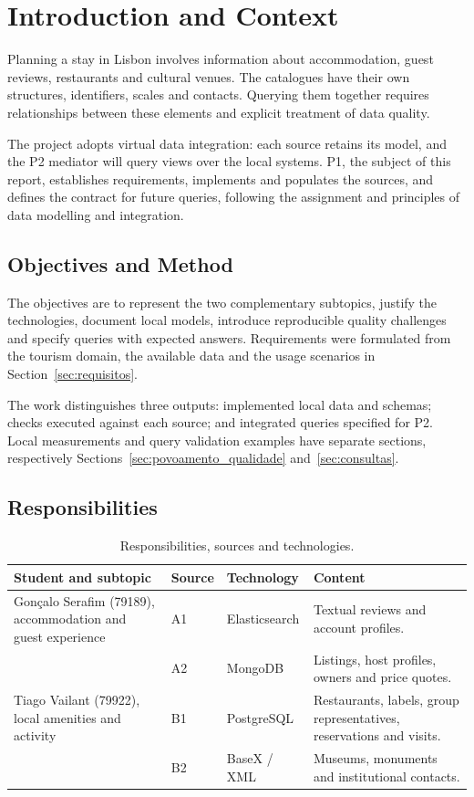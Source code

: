 \section{Introduction and Context}
\label{sec:introducao}
Planning a stay in Lisbon involves information about accommodation, guest reviews, restaurants and cultural venues. The catalogues have their own structures, identifiers, scales and contacts. Querying them together requires relationships between these elements and explicit treatment of data quality.

The project adopts virtual data integration: each source retains its model, and the P2 mediator will query views over the local systems. P1, the subject of this report, establishes requirements, implements and populates the sources, and defines the contract for future queries, following the assignment\cite{dmi_enunciado2026} and principles of data modelling and integration\cite{lemahieu2018principles,doan2012principles}.

\subsection{Objectives and Method}
The objectives are to represent the two complementary subtopics, justify the technologies, document local models, introduce reproducible quality challenges and specify queries with expected answers. Requirements were formulated from the tourism domain, the available data and the usage scenarios in Section~\ref{sec:requisitos}.

The work distinguishes three outputs: implemented local data and schemas; checks executed against each source; and integrated queries specified for P2. Local measurements and query validation examples have separate sections, respectively Sections~\ref{sec:povoamento_qualidade} and~\ref{sec:consultas}.

\subsection{Responsibilities}
\begin{table}[!htbp]
\centering\footnotesize
\setlength{\tabcolsep}{4pt}\renewcommand{\arraystretch}{1.1}
\caption{Responsibilities, sources and technologies.}\label{tab:divisao_trabalho}
\begin{tabularx}{\textwidth}{>{\raggedright\arraybackslash}p{3.2cm}l>{\raggedright\arraybackslash}p{2.5cm}X}
\toprule
\textbf{Student and subtopic} & \textbf{Source} & \textbf{Technology} & \textbf{Content} \\
\midrule
Gonçalo Serafim (79189), accommodation and guest experience & A1 & Elasticsearch & Textual reviews and account profiles. \\
 & A2 & MongoDB & Listings, host profiles, owners and price quotes. \\
Tiago Vailant (79922), local amenities and activity & B1 & PostgreSQL & Restaurants, labels, group representatives, reservations and visits. \\
 & B2 & BaseX / XML & Museums, monuments and institutional contacts. \\
\bottomrule
\end{tabularx}
\end{table}
